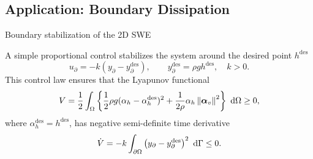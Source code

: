 \documentclass[10pt,aspectratio=43]{ISAE-Beamer}
\newcommand{\Alphav}{\boldsymbol{\alpha}_v}
\newcommand{\dd}{{\rm ~d}}
\newcommand*{\norm}[1]{\ensuremath{\left\|#1\right\|}}
\begin{document}
\subsection{Application: Boundary Dissipation}

\begin{frame}{Boundary stabilization of the 2D SWE}

A simple proportional control stabilizes the system around the desired point $h^{\text{des}}$
	\begin{equation*}
	u_\partial = -k (y_\partial - y_\partial^{\text{des}}), \qquad y_\partial^{\text{des}}= \rho g h^{\text{des}}, \quad k>0.
	\end{equation*}
	This control law ensures that the Lyapunov functional
	\begin{equation*}
	V = \frac{1}{2} \int_{\Omega}\left\{\frac{1}{2} \rho g (\alpha_h - \alpha_h^{\text{des}})^2 + \frac{1}{2\rho} \alpha_h \norm{\Alphav}^2 \right\} \dd\Omega \ge 0,
	\end{equation*}
	where $\alpha_h^{\text{des}}=h^{\text{des}}$, has negative semi-definite time derivative
	\begin{equation*}
	\dot{V} = -k \int_{\partial \Omega}\left({y}_\partial - {y}_\partial^{\text{des}} \right)^2 \dd{\Gamma} \le 0.
	\end{equation*}
\end{frame}




\iffalse

\end{document}
